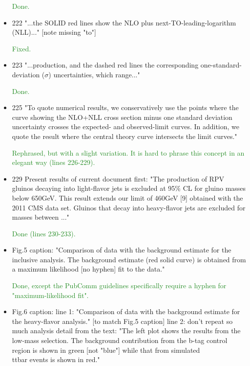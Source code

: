 \documentclass[paper=a4, fontsize=11pt]{scrartcl}
\begin{document}
\begin{itemize}
\textcolor{ForestGreen}{Done.}

\item 222 "...the SOLID red lines show the NLO plus
 next-TO-leading-logarithm (NLL)..."
 [note missing "to"]
 
\textcolor{ForestGreen}{Fixed.}

\item 223 "...production, and the dashed red lines the corresponding
 one-standard-deviation ($\sigma$) uncertainties, which range..."
 
\textcolor{ForestGreen}{Done.}

\item 225 "To quote numerical results, we conservatively use the
 points where the curve showing the NLO+NLL cross section
 minus one standard deviation uncertainty crosses the
 expected- and observed-limit curves.  In addition,
 we quote the result where the central theory curve
 intersects the limit curves."
 
\textcolor{ForestGreen}{Rephrased, but with a slight variation. It is hard to phrase this concept
 in an elegant way (lines 226-229).}

\item 229 Present results of current document first:
 "The production of RPV gluinos decaying into light-flavor jets is
 excluded at 95\% CL for gluino masses below 650GeV.  This result
 extends our limit of 460GeV [9] obtained with the 2011 CMS data set.
 Gluinos that decay into heavy-flavor jets are excluded for masses
 between ..."
 
\textcolor{ForestGreen}{Done (lines 230-233).}

\item Fig.5 caption:
 "Comparison of data with the background estimate for the inclusive
  analysis.  The background estimate (red solid curve) is obtained
  from a maximum likelihood [no hyphen] fit to the data."
 
\textcolor{ForestGreen}{Done, except the PubComm guidelines specifically require a
 hyphen for "maximum-likelihood fit".}

\item Fig.6 caption:
 line 1: "Comparison of data with the background estimate for
   the heavy-flavor analysis." [to match Fig.5 caption]
 line 2: don't repeat so much analysis detail from the text:
   "The left plot shows the results from the low-mass selection.
   The background contribution from the b-tag control region is
   shown in green [not "blue"] while that from simulated \\ttbar
   events is shown in red."
   

\end{itemize}
\end{document}
